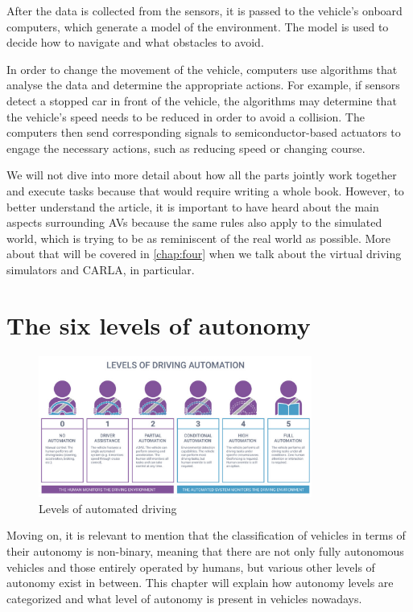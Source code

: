 After the data is collected from the sensors, it is passed to the vehicle's onboard computers, which generate a model of the environment. The model is used to decide how to navigate and what obstacles to avoid.

In order to change the movement of the vehicle, computers use algorithms that analyse the data and determine the appropriate actions. For example, if sensors detect a stopped car in front of the vehicle, the algorithms may determine that the vehicle's speed needs to be reduced in order to avoid a collision. The computers then send corresponding signals to semiconductor-based actuators to engage the necessary actions, such as reducing speed or changing course.

We will not dive into more detail about how all the parts jointly work together and execute tasks because that would require writing a whole book. However, to better understand the article, it is important to have heard about the main aspects surrounding AVs because the same rules also apply to the simulated world, which is trying to be as reminiscent of the real world as possible. More about that will be covered in \autoref{chap:four} when we talk about the virtual driving simulators and CARLA, in particular.

\section{The six levels of autonomy} \label{sect-2.3}

\begin{figure}
    \centering
    \includegraphics[width = 0.8\textwidth]{Images/six_levels_of_automation.png}
    \caption{Levels of automated driving}
    \label{fig:six_levels_of_autonomy}
\end{figure}

Moving on, it is relevant to mention that the classification of vehicles in terms of their autonomy is non-binary, meaning that there are not only fully autonomous vehicles and those entirely operated by humans, but various other levels of autonomy exist in between. This chapter will explain how autonomy levels are categorized and what level of autonomy is present in vehicles nowadays.

